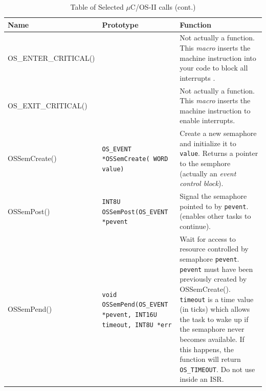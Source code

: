 \documentclass{article}	%
\begin{document}
\begin{table}
\begin{center}
  \begin{tabular}{|l|p{1.6in}|p{2.75in} |}
  \hline
Name   &  Prototype  &  Function \\ \hline
OS\_ENTER\_CRITICAL()   & {\tt }        &
                Not actually a function.  This {\it macro} inserts
                the machine instruction into
                your code to block all interrupts .      \\ \hline
OS\_EXIT\_CRITICAL()    & {\tt }        &
                Not actually a function.  This {\it macro} inserts
                the machine instruction to enable interrupts. \\ \hline
OSSemCreate()   & {\tt OS\_EVENT *OSSemCreate( WORD value)}     &
                Create a new semaphore and initialize it to
                {\tt value}. Returns a pointer to the semphore
                (actually an {\it event control block}).  \\ \hline
OSSemPost()     & {\tt INT8U OSSemPost(OS\_EVENT *pevent }      &
                Signal the semaphore pointed to by {\tt pevent}.
                (enables other tasks to continue).   \\ \hline
OSSemPend()     & {\tt void OSSemPend(OS\_EVENT *pevent, INT16U timeout, INT8U *err }   &
                Wait for access to resource controlled by semaphore {\tt pevent}.
                {\tt pevent} must have been previously created by
                OSSemCreate(). {\tt timeout} is a time value (in ticks)
                which allows the task to wake up  if the semaphore
                never becomes available.  If this happens, the
                function will return {\tt OS\_TIMEOUT}. Do not use inside
                an ISR.   \\ \hline

 \end{tabular}

\caption{Table of Selected $\mu$C/OS-II calls (cont.)}
\label{Ta:FC1}
\end{center}
\end{table}




\newpage	%
\end{document}
